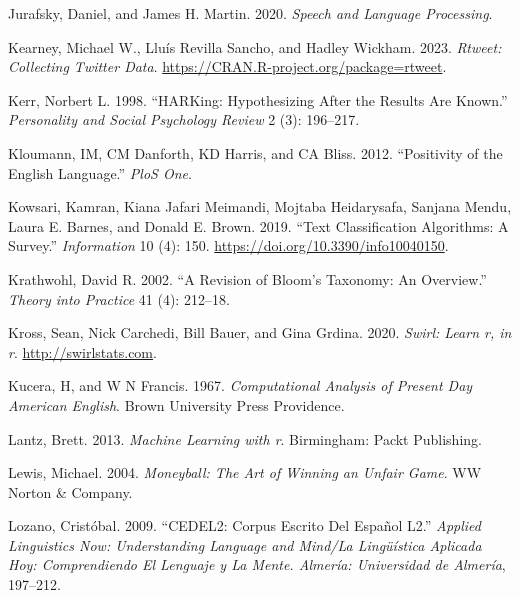 \documentclass[
  letterpaper,
]{latex/krantz}
\newlength{\cslhangindent}
\newlength{\cslentryspacingunit} %
\newenvironment{CSLReferences}[2] %
 {%
  \setlength{\parindent}{0pt}
  \ifodd #1
  \let\oldpar\par
  \def\par{\hangindent=\cslhangindent\oldpar}
  \fi
  \setlength{\parskip}{#2\cslentryspacingunit}
 }%
 {}
\begin{document}
\begin{CSLReferences}{1}{0}
\leavevmode{}%
Jurafsky, Daniel, and James H. Martin. 2020. \emph{Speech and Language
Processing}.

\leavevmode{}%
Kearney, Michael W., Lluís Revilla Sancho, and Hadley Wickham. 2023.
\emph{Rtweet: Collecting Twitter Data}.
\url{https://CRAN.R-project.org/package=rtweet}.

\leavevmode{}%
Kerr, Norbert L. 1998. {``HARKing: Hypothesizing After the Results Are
Known.''} \emph{Personality and Social Psychology Review} 2 (3):
196--217.

\leavevmode{}%
Kloumann, IM, CM Danforth, KD Harris, and CA Bliss. 2012. {``Positivity
of the English Language.''} \emph{PloS One}.

\leavevmode{}%
Kowsari, Kamran, Kiana Jafari Meimandi, Mojtaba Heidarysafa, Sanjana
Mendu, Laura E. Barnes, and Donald E. Brown. 2019. {``Text
Classification Algorithms: A Survey.''} \emph{Information} 10 (4): 150.
\url{https://doi.org/10.3390/info10040150}.

\leavevmode{}%
Krathwohl, David R. 2002. {``A Revision of Bloom's Taxonomy: An
Overview.''} \emph{Theory into Practice} 41 (4): 212--18.

\leavevmode{}%
Kross, Sean, Nick Carchedi, Bill Bauer, and Gina Grdina. 2020.
\emph{Swirl: Learn r, in r}. \url{http://swirlstats.com}.

\leavevmode{}%
Kucera, H, and W N Francis. 1967. \emph{Computational Analysis of
Present Day American English}. Brown University Press Providence.

\leavevmode{}%
Lantz, Brett. 2013. \emph{Machine Learning with r}. Birmingham: Packt
Publishing.

\leavevmode{}%
Lewis, Michael. 2004. \emph{Moneyball: The Art of Winning an Unfair
Game}. WW Norton \& Company.

\leavevmode{}%
Lozano, Cristóbal. 2009. {``CEDEL2: Corpus Escrito Del Español L2.''}
\emph{Applied Linguistics Now: Understanding Language and Mind/La
Lingüística Aplicada Hoy: Comprendiendo El Lenguaje y La Mente. Almería:
Universidad de Almería}, 197--212.


\end{CSLReferences}
\end{document}
